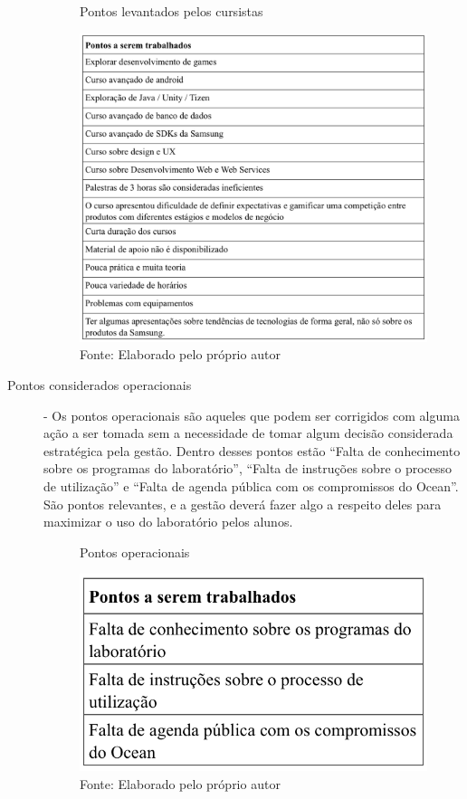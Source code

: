\begin{description}
\begin{figure}[H]
\caption{Pontos levantados pelos cursistas}
\centerline{\includegraphics[scale=0.75]{img/pontosselecionadoscursistas}}
\label{fig:pontosselecionadoscursistas}
\caption* {Fonte: Elaborado pelo próprio autor}
\end{figure}

\item[Pontos considerados operacionais] - Os pontos operacionais são aqueles que podem ser corrigidos com alguma ação a ser tomada sem a necessidade de tomar algum decisão considerada estratégica pela gestão. Dentro desses pontos estão \enquote{Falta de conhecimento sobre os programas do laboratório}, \enquote{Falta de instruções sobre o processo de utilização} e \enquote{Falta de agenda pública com os compromissos do Ocean}. São pontos relevantes, e a gestão deverá fazer algo a respeito deles para maximizar o uso do laboratório pelos alunos.

\begin{figure}[H]
\caption{Pontos operacionais}
\centerline{\includegraphics[scale=0.75]{img/pontosselecionadosoperacionais}}
\label{fig:pontosselecionadosoperacionais}
\caption* {Fonte: Elaborado pelo próprio autor}
\end{figure}


\end{description}

